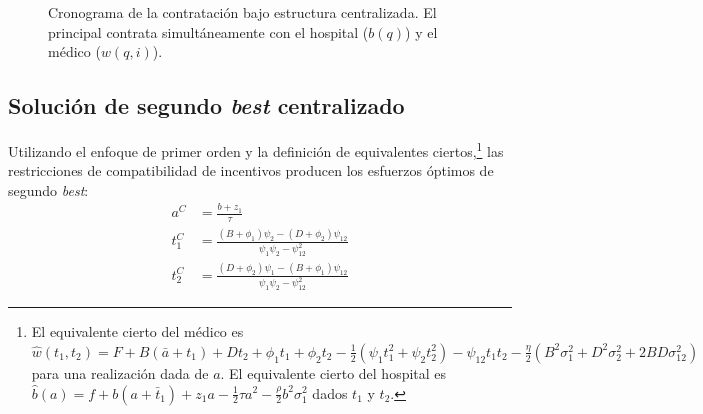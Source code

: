 \begin{figure}[htbp]
\centering
{}%
\caption{Cronograma de la contratación bajo estructura centralizada.
  El principal contrata simultáneamente con el hospital ($b(q)$)
  y el médico ($w(q,i)$).}
\label{fig:cronograma_c}
\end{figure}
\subsection{Solución de segundo \texorpdfstring{\textit{best}}{best} centralizado}

Utilizando el enfoque de primer orden y la definición de equivalentes ciertos,\footnote{El equivalente cierto del médico es $\widehat{w}(t_1,t_2)=F+B(\bar{a}+t_1)+Dt_2+\phi_1t_1+\phi_2t_2-\frac{1}{2}(\psi_1t_1^2+\psi_2t_2^2)-\psi_{12}t_1t_2-\frac{\eta}{2}(B^2\sigma_1^2+D^2\sigma_2^2+2BD\sigma_{12}^2)$ para una realización dada de $a$. El equivalente cierto del hospital es $\widehat{b}(a)=f+b(a+\bar{t}_1)+z_1a-\frac{1}{2}\tau a^2-\frac{\rho}{2}b^2\sigma_1^2$ dados $t_1$ y $t_2$.} las restricciones de compatibilidad de incentivos producen los esfuerzos óptimos de segundo \textit{best}:
\begin{align}
  a^{C} &= \frac{b+z_1}{\tau} \label{eq:a_sb}\\
  t_1^{C} &= \frac{(B+\phi_1)\psi_2-(D+\phi_2)\psi_{12}}{\psi_1\psi_2-\psi_{12}^2} \label{eq:t1_sb}\\
  t_2^{C} &= \frac{(D+\phi_2)\psi_1-(B+\phi_1)\psi_{12}}{\psi_1\psi_2-\psi_{12}^2} \label{eq:t2_sb}
\end{align}

